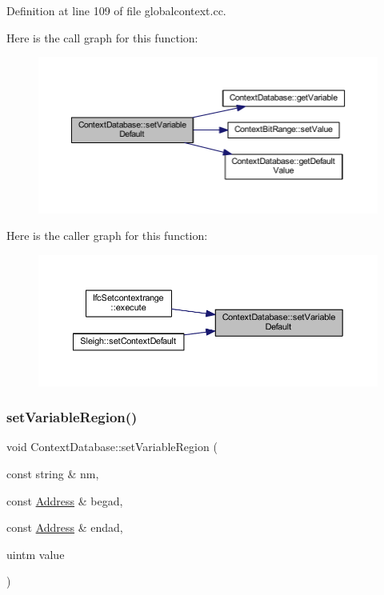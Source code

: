 Definition at line 109 of file globalcontext.\+cc.

Here is the call graph for this function\+:
\nopagebreak
\begin{figure}[H]
\begin{center}
\leavevmode
\includegraphics[width=350pt]{class_context_database_ad076227dbe22aad0f4a379e2f39ef488_cgraph}
\end{center}
\end{figure}
Here is the caller graph for this function\+:
\nopagebreak
\begin{figure}[H]
\begin{center}
\leavevmode
\includegraphics[width=350pt]{class_context_database_ad076227dbe22aad0f4a379e2f39ef488_icgraph}
\end{center}
\end{figure}
\mbox{\label{class_context_database_a567fd374a19fcb9a85ac96e4f2fea27e}} 
\subsubsection{\texorpdfstring{setVariableRegion()}{setVariableRegion()}}
{\footnotesize\ttfamily void Context\+Database\+::set\+Variable\+Region (\begin{DoxyParamCaption}\item[{const string \&}]{nm,  }\item[{const \mbox{\hyperlink{class_address}{Address}} \&}]{begad,  }\item[{const \mbox{\hyperlink{class_address}{Address}} \&}]{endad,  }\item[{uintm}]{value }\end{DoxyParamCaption})}



